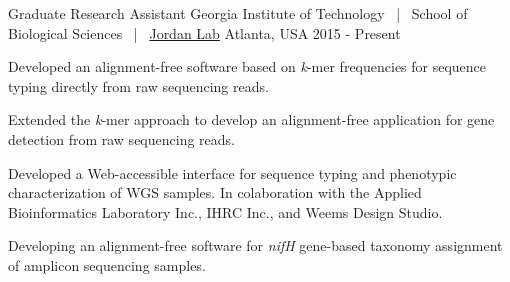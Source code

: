 



\begin{cventries}
\cventry
{Graduate Research Assistant} %
{Georgia Institute of Technology {\normalfont ~|~ School of Biological Sciences} {\normalfont ~|~ \href{http://jordan.biology.gatech.edu}{Jordan Lab}}} %
{Atlanta, USA} %
{2015 - Present} %
{ %
\textit{}
\vspace{\acvDescAfterDutiesSkip}
\begin{cvitems}
\item {Developed an alignment-free software based on \textit{k}-mer frequencies for sequence typing directly from raw sequencing reads.}
\item {Extended the \textit{k}-mer approach to develop an alignment-free application for gene detection from raw sequencing reads.}
\item {Developed a Web-accessible interface for sequence typing and phenotypic characterization of WGS samples. In colaboration with the Applied Bioinformatics Laboratory Inc., IHRC Inc., and Weems Design Studio.}
\item {Developing an alignment-free software for \textit{nifH} gene-based taxonomy assignment of amplicon sequencing samples.}
\end{cvitems}
}


\end{cventries}
